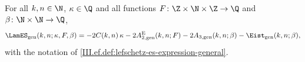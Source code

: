 For all $k,n\in\N$, $\kappa\in\Q$ and all functions $F\colon\Z\times\N\times\Z\to\Q$ and $\beta\colon\N\times\N\to\Q$,
\[
  \LamES_{\mathrm{gen}}(k,n;\kappa,F,\beta)=-2C(k,n)\,\kappa-2A_{2,\mathrm{gen}}^{\mathrm E}(k,n;F)-2A_{3,\mathrm{gen}}(k,n;\beta)-\Eist_{\mathrm{gen}}(k,n;\beta),
\]
with the notation of \cref{III.ef.def:lefschetz-es-expression-general}.
